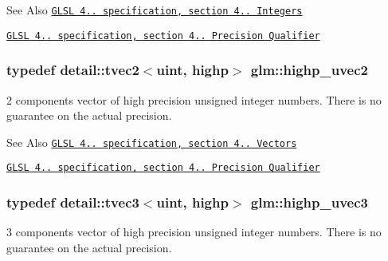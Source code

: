 \begin{DoxySeeAlso}{See Also}
\href{http://www.opengl.org/registry/doc/GLSLangSpec.4.20.8.pdf}{\tt G\-L\-S\-L 4.. specification, section 4.. Integers} 

\href{http://www.opengl.org/registry/doc/GLSLangSpec.4.20.8.pdf}{\tt G\-L\-S\-L 4.. specification, section 4.. Precision Qualifier} 
\end{DoxySeeAlso}
\hypertarget{group__core__precision_gaaf92be4c1fca33cff90c1ed15b521c79}{
\subsubsection[{highp\-\_\-uvec2}]{\setlength{\rightskip}{0pt plus 5cm}typedef detail\-::tvec2$<$uint, highp$>$ {\bf glm\-::highp\-\_\-uvec2}}}\label{group__core__precision_gaaf92be4c1fca33cff90c1ed15b521c79}
2 components vector of high precision unsigned integer numbers. There is no guarantee on the actual precision.

\begin{DoxySeeAlso}{See Also}
\href{http://www.opengl.org/registry/doc/GLSLangSpec.4.20.8.pdf}{\tt G\-L\-S\-L 4.. specification, section 4.. Vectors} 

\href{http://www.opengl.org/registry/doc/GLSLangSpec.4.20.8.pdf}{\tt G\-L\-S\-L 4.. specification, section 4.. Precision Qualifier} 
\end{DoxySeeAlso}
\hypertarget{group__core__precision_ga66d0e4ae1742ede2eb32bf0bfedd7474}{
\subsubsection[{highp\-\_\-uvec3}]{\setlength{\rightskip}{0pt plus 5cm}typedef detail\-::tvec3$<$uint, highp$>$ {\bf glm\-::highp\-\_\-uvec3}}}\label{group__core__precision_ga66d0e4ae1742ede2eb32bf0bfedd7474}
3 components vector of high precision unsigned integer numbers. There is no guarantee on the actual precision.

